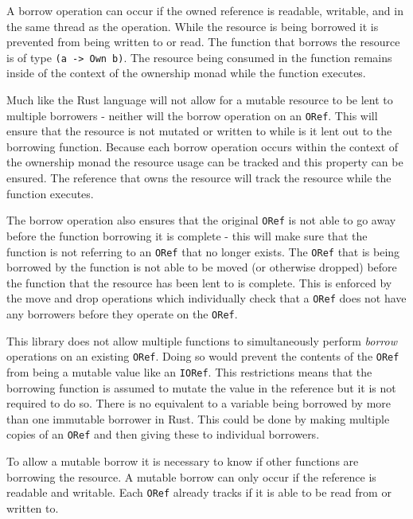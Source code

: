 \documentclass[onehalf,11pt]{beavtex}
\begin{document}
A borrow operation can occur if the owned reference is readable, writable, and
in the same thread as the operation.
While the resource is being borrowed it is prevented from being written to or
read.
The function that borrows the resource is of type \texttt{(a -> Own b)}. The
resource being consumed in the function remains inside of the context of the
ownership monad while the function executes. %

Much like the Rust language will not allow for a mutable resource to be lent to
multiple borrowers - neither will the borrow operation on an \texttt{ORef}.
This will ensure that the resource is not mutated or written to while is it lent
out to the borrowing function.
Because each borrow operation occurs within the context of the ownership monad
the resource usage can be tracked and this property can be ensured. The
reference that owns the resource will track the resource while the function
executes.

The borrow operation also ensures that the original \texttt{ORef} is not able to
go away before the function borrowing it is complete - this will make sure that
the function is not referring to an \texttt{ORef} that no longer exists.
The \texttt{ORef} that is being borrowed by the function is not able to be moved
(or otherwise dropped) before the function that the resource has been lent to is
complete. This is enforced by the move and drop operations which individually
check that a \texttt{ORef} does not have any borrowers before they operate on
the \texttt{ORef}.

This library does not allow multiple functions to simultaneously perform
\textit{borrow} operations on an existing \texttt{ORef}. Doing
so would prevent the contents of the \texttt{ORef} from being a mutable
value like an \texttt{IORef}.  This restrictions means that the borrowing
function is assumed to mutate the value in the reference but it is not
required to do so.
There is no equivalent to a variable being borrowed by more than one immutable
borrower in Rust.
This could be done by making multiple copies of an \texttt{ORef} and
then giving these to individual borrowers.


To allow a mutable borrow it is necessary to know if other functions are
borrowing the resource. A mutable borrow can only occur if the reference
is readable and writable.
Each \texttt{ORef} already tracks if it is able to be read from or written to.
\end{document}
